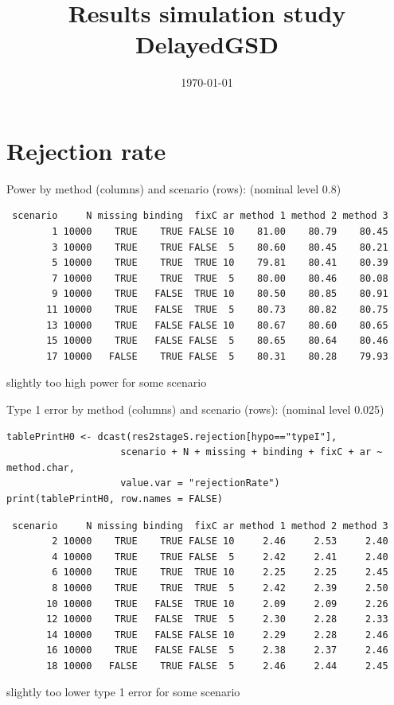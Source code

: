 \documentclass[12pt]{article}
\date{\today}
\title{Results simulation study DelayedGSD}
\newcommand\Warning[1][3ex]{%
\renewcommand\stacktype{L}%
\scaleto{\stackon[1.3pt]{\color{red}$\triangle$}{\tiny\bfseries !}}{#1}%
\xspace
}
\begin{document}
\maketitle

\section{Rejection rate}
\label{sec:org9d1a00c}

Power by method (columns) and scenario (rows): \hfill (nominal level 0.8)
\begin{verbatim}
 scenario     N missing binding  fixC ar method 1 method 2 method 3
        1 10000    TRUE    TRUE FALSE 10    81.00    80.79    80.45
        3 10000    TRUE    TRUE FALSE  5    80.60    80.45    80.21
        5 10000    TRUE    TRUE  TRUE 10    79.81    80.41    80.39
        7 10000    TRUE    TRUE  TRUE  5    80.00    80.46    80.08
        9 10000    TRUE   FALSE  TRUE 10    80.50    80.85    80.91
       11 10000    TRUE   FALSE  TRUE  5    80.73    80.82    80.75
       13 10000    TRUE   FALSE FALSE 10    80.67    80.60    80.65
       15 10000    TRUE   FALSE FALSE  5    80.65    80.64    80.46
       17 10000   FALSE    TRUE FALSE  5    80.31    80.28    79.93
\end{verbatim}
\Warning slightly too high power for some scenario

\bigskip

Type 1 error by method (columns) and scenario (rows): \hfill (nominal level 0.025)
\lstset{language=r,label= ,caption= ,captionpos=b,numbers=none}
\begin{lstlisting}
tablePrintH0 <- dcast(res2stageS.rejection[hypo=="typeI"],
                    scenario + N + missing + binding + fixC + ar ~ method.char,
                    value.var = "rejectionRate")
print(tablePrintH0, row.names = FALSE)
\end{lstlisting}

\begin{verbatim}
 scenario     N missing binding  fixC ar method 1 method 2 method 3
        2 10000    TRUE    TRUE FALSE 10     2.46     2.53     2.40
        4 10000    TRUE    TRUE FALSE  5     2.42     2.41     2.40
        6 10000    TRUE    TRUE  TRUE 10     2.25     2.25     2.45
        8 10000    TRUE    TRUE  TRUE  5     2.42     2.39     2.50
       10 10000    TRUE   FALSE  TRUE 10     2.09     2.09     2.26
       12 10000    TRUE   FALSE  TRUE  5     2.30     2.28     2.33
       14 10000    TRUE   FALSE FALSE 10     2.29     2.28     2.46
       16 10000    TRUE   FALSE FALSE  5     2.38     2.37     2.46
       18 10000   FALSE    TRUE FALSE  5     2.46     2.44     2.45
\end{verbatim}
\Warning slightly too lower type 1 error for some scenario
\end{document}
